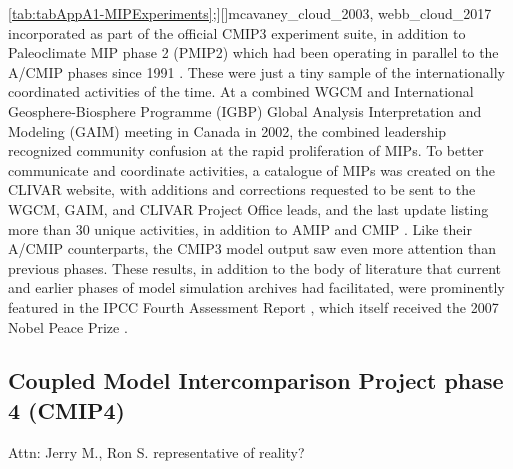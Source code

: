 \documentclass[gmd, preprint]{copernicus}
\newcommand{\mycomment}[1]{}
\def\cred#1{{\color{red}#1}}
\begin{document}
\autoref{tab:tabAppA1-MIPExperiments};][]{mcavaney_cloud_2003, webb_cloud_2017} incorporated as part of the official CMIP3 experiment suite, in addition to Paleoclimate MIP phase 2 (PMIP2) which had been operating in parallel to the A/CMIP phases since 1991 \citep{villwock_6th_2003, braconnot_paleoclimate_2011}. These were just a tiny sample of the internationally coordinated activities of the time. At a combined WGCM and International Geosphere-Biosphere Programme (IGBP) Global Analysis Interpretation and Modeling (GAIM) meeting in Canada in 2002, the combined leadership recognized community confusion at the rapid proliferation of MIPs. To better communicate and coordinate activities, a catalogue of MIPs was created on the CLIVAR website, with additions and corrections requested to be sent to the WGCM, GAIM, and CLIVAR Project Office leads, and the last update listing more than 30 unique activities, in addition to AMIP and CMIP \citep{meehl_catalogue_2003}. Like their A/CMIP counterparts, the CMIP3 model output saw even more attention than previous phases. These results, in addition to the body of literature that current and earlier phases of model simulation archives had facilitated, were prominently featured in the IPCC Fourth Assessment Report \citep[AR4;][]{randall_climate_2007}, which itself received the 2007 Nobel Peace Prize \citep{kerr_nobel_2007}.

\mycomment{
CLIVAR MIPs list circa 2005 - lots ~30
http://web.archive.org/web/20050319232556/http://www.clivar.org/science/mips.htm
This omits the CMIP Coordinated Experiment focus which were all announced in 2002 - https://web.archive.org/web/20040827091054/http://www-pcmdi.llnl.gov/cmip/ - subsequently known as CMIP3
Also https://pcmdi.llnl.gov/mips/cmip/ann_20c3m.html
Also PCMDI provided disks to modelling groups who copied data and posted them back - Meehl et al., 2003
Meehl & Hibbard, 2007: A STRATEGY FOR CLIMATE CHANGE STABILIZATION EXPERIMENTS WITH AOGCMs AND ESMs https://www.agci.org/wp-content/uploads/imported-files/2022/07/06S1_WhitePaper.pdf
C4MIP ~2002 https://web.archive.org/web/20040804013119/http://www.c4mip.cnrs-gif.fr/protocol.html
}


\subsection{Coupled Model Intercomparison Project phase 4 (CMIP4)}
\cred{Attn: Jerry M., Ron S. representative of reality?}
\end{document}
